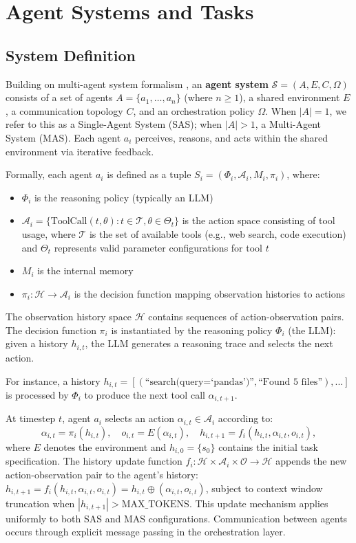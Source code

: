 \section{Agent Systems and Tasks}
\label{sec:methods}

\subsection{System Definition}

Building on multi-agent system formalism \citep{zhu2025establishing, guo2024large}, an \textbf{agent system} $\mathcal{S} = (A, E, C, \Omega)$ consists of a set of agents $A = \{a_1, \ldots, a_n\}$ (where $n \geq 1$), a shared environment $E$, a communication topology $C$, and an orchestration policy $\Omega$. When $|A| = 1$, we refer to this as a Single-Agent System (SAS); when $|A| > 1$, a Multi-Agent System (MAS). Each agent $a_i$ perceives, reasons, and acts within the shared environment via iterative feedback.


Formally, each agent $a_i$ is defined as a tuple $S_i=(\Phi_i,\mathcal{A}_i,M_i,\pi_i)$, where:
\begin{itemize}
    \item $\Phi_i$ is the reasoning policy (typically an LLM)
    \item $\mathcal{A}_i = \{\text{ToolCall}(t, \theta) : t \in \mathcal{T}, \theta \in \Theta_t\}$ is the action space consisting of tool usage, where $\mathcal{T}$ is the set of available tools (e.g., web search, code execution) and $\Theta_t$ represents valid parameter configurations for tool $t$
    \item $M_i$ is the internal memory
    \item $\pi_i: \mathcal{H} \rightarrow \mathcal{A}_i$ is the decision function mapping observation histories to actions
\end{itemize}

The observation history space $\mathcal{H}$ contains sequences of action-observation pairs. The decision function $\pi_i$ is instantiated by the reasoning policy $\Phi_i$ (the LLM): given a history $h_{i,t}$, the LLM generates a reasoning trace and selects the next action. 

For instance, a history $h_{i,t} = [(\text{``search(query=`pandas')''}, \text{``Found 5 files''}), ...]$ is processed by $\Phi_i$ to produce the next tool call $\alpha_{i,t+1}$.

At timestep $t$, agent $a_i$ selects an action $\alpha_{i,t} \in \mathcal{A}_i$ according to:
\[
\alpha_{i,t}=\pi_i(h_{i,t}), \quad 
o_{i,t}=E(\alpha_{i,t}), \quad 
h_{i,t+1}=f_i(h_{i,t},\alpha_{i,t},o_{i,t}),
\]
where $E$ denotes the environment and $h_{i,0} = \{s_0\}$ contains the initial task specification. The history update function $f_i: \mathcal{H} \times \mathcal{A}_i \times \mathcal{O} \rightarrow \mathcal{H}$ appends the new action-observation pair to the agent's history: $h_{i,t+1} = f_i(h_{i,t}, \alpha_{i,t}, o_{i,t}) = h_{i,t} \oplus (\alpha_{i,t}, o_{i,t})$, subject to context window truncation when $|h_{i,t+1}| > \text{MAX\_TOKENS}$. This update mechanism applies uniformly to both SAS and MAS configurations. Communication between agents occurs through explicit message passing in the orchestration layer.

